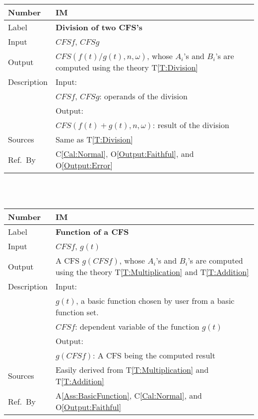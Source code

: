 \documentclass[12pt]{article}
\newcommand{\colAwidth}{0.13\textwidth}
\newcommand{\colBwidth}{0.82\textwidth}
\newcommand{\tref}[1]{T\ref{#1}}
\newcounter{instnum} %
\newcommand{\aref}[1]{A\ref{#1}}
\newcommand{\calref}[1]{C\ref{#1}}
\newcommand{\oref}[1]{O\ref{#1}}
\begin{document}
\noindent
\begin{minipage}{\textwidth}
	\renewcommand*{\arraystretch}{1.5}
	\begin{tabular}{| p{\colAwidth} | p{\colBwidth}|}
		\hline
		\rowcolor[gray]{0.9}
		Number& IM{instnum}\theinstnum 
		\label{IM:Division}\\
		\hline
		Label& \bf Division of two CFS's \\
		\hline
		Input& $\mathit{CFSf}$, $\mathit{CFSg}$\\
		\hline
		Output& $\mathit{CFS}(f(t)/g(t), n, \omega)$, whose $A_i$'s 
		and $B_i$'s are computed using the theory 
		\tref{T:Division}\\
		\hline
		Description&Input:\\
		&$\mathit{CFSf}$, $\mathit{CFSg}$: operands of 
		the division\\
		&Output:\\
		& $\mathit{CFS}(f(t)+g(t), n, \omega)$: result of 
		the division\\
		\hline
		Sources&Same as \tref{T:Division}		\\
		\hline
		Ref.\ By &  
		\calref{Cal:Normal}, 
		\oref{Output:Faithful}, and \oref{Output:Error}\\
		\hline
	\end{tabular}
\end{minipage}\\
~\newline

\noindent
\begin{minipage}{\textwidth}
	\renewcommand*{\arraystretch}{1.5}
	\begin{tabular}{| p{\colAwidth} | p{\colBwidth}|}
		\hline
		\rowcolor[gray]{0.9}
		Number& IM{instnum}\theinstnum 
		\label{IM:Function}\\
		\hline
		Label& \bf Function of a CFS \\
		\hline
		Input& $\mathit{CFSf}$, $g(t)$\\
		\hline
		Output& A CFS $g(CFSf)$, whose $A_i$'s and $B_i$'s 
		are computed using the theory \tref{T:Multiplication} 
		and \tref{T:Addition}\\
		\hline
		Description&Input:\\
		& $g(t)$, a basic function chosen by user from a 
		basic function set.\\
		&$\mathit{CFSf}$: dependent variable of the function $g(t)$\\
		&Output:\\
		& $g(CFSf)$: A CFS being the computed result\\
		\hline
		Sources&Easily derived from \tref{T:Multiplication} 
		and \tref{T:Addition}\\
		\hline
		Ref.\ By & \aref{Ass:BasicFunction}, \calref{Cal:Normal}, 
		and \oref{Output:Faithful}\\
		\hline
	\end{tabular}
\end{minipage}\\
~\newline
\end{document}
